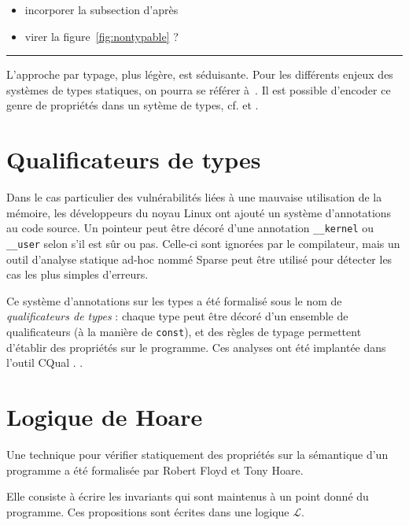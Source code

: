 \begin{itemize}
\item
  incorporer la subsection d'après
\item
  virer la figure~\ref{fig:nontypable} ?
\end{itemize}

\begin{center}\rule{3in}{0.4pt}\end{center}

L'approche par typage, plus légère, est séduisante. Pour les différents enjeux
des systèmes de types statiques, on pourra se référer à~\cite{TAPL}. Il est
possible d'encoder ce genre de propriétés dans un sytème de types, cf.
\cite{lightweight-static-capabilities} et \cite{LZ06a}.

\section{Qualificateurs de types}

Dans le cas particulier des vulnérabilités liées à une mauvaise utilisation de
la mémoire, les développeurs du noyau Linux ont ajouté un système d'annotations
au code source. Un pointeur peut être décoré d'une annotation
\texttt{\_\_kernel} ou \texttt{\_\_user} selon s'il est sûr ou pas. Celle-ci
sont ignorées par le compilateur, mais un outil d'analyse statique ad-hoc nommé
Sparse  peut être utilisé pour détecter les cas les plus simples
d'erreurs.

Ce système d'annotations sur les types a été formalisé sous le nom de
\emph{qualificateurs de types} : chaque type peut être décoré d'un ensemble de
qualificateurs (à la manière de \texttt{const}), et des règles de typage
permettent d'établir des propriétés sur le programme. Ces analyses ont été
implantée dans l'outil CQual
\cite{pldi99,usenix01,pldi02,cquk-usenix04,toplas-quals}. .

\section{Logique de Hoare}

Une technique pour vérifier statiquement des propriétés sur la sémantique d'un
programme a été formalisée par Robert Floyd\cite{FloydMeaning} et Tony
Hoare\cite{hoare}.

Elle consiste à écrire les invariants qui sont maintenus à un point donné du
programme. Ces propositions sont écrites dans une logique $\mathcal{L}$.

